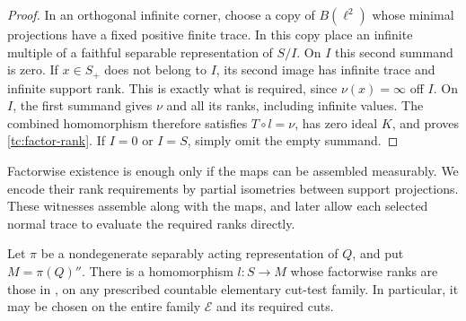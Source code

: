 \begin{proof}
In an orthogonal infinite corner, choose a copy of $B(\ell^2)$ whose
minimal projections have a fixed positive finite trace.  In this copy
place an infinite multiple of a faithful separable representation of
$S/I$.  On $I$ this second summand is zero.  If $x\in S_+$ does not
belong to $I$, its second image has infinite trace and infinite support
rank.  This is exactly what is required, since $\nu(x)=\infty$ off
$I$.  On $I$, the first summand gives $\nu$ and all its ranks, including
infinite values.  The combined homomorphism therefore satisfies
$T\circ l=\nu$, has zero ideal $K$, and proves
\eqref{tc:factor-rank}.  If $I=0$ or $I=S$, simply omit the empty
summand.
\end{proof}

Factorwise existence is enough only if the maps can be assembled
measurably.  We encode their rank requirements by partial isometries
between support projections.  These witnesses assemble along with the
maps, and later allow each selected normal trace to evaluate the required
ranks directly.

\begin{lemma}\label{tc:measurable-realization}
Let $\pi$ be a nondegenerate separably acting representation of $Q$,
and put $M=\pi(Q)''$.  There is a homomorphism $l:S\to M$ whose
factorwise ranks are those in , on any
prescribed countable elementary cut-test family.  In particular, it
may be chosen on the entire family $\mathcal E$ and its required cuts.
\end{lemma}

